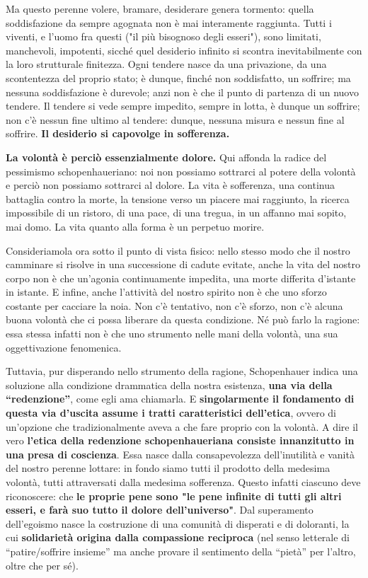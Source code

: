 Ma questo perenne volere, bramare, desiderare genera tormento: quella soddisfazione da sempre agognata non è mai interamente raggiunta. Tutti i viventi, e l’uomo fra questi ("il più bisognoso degli esseri"), sono limitati, manchevoli, impotenti, sicché quel desiderio infinito si scontra inevitabilmente con la loro strutturale finitezza. Ogni tendere nasce da una privazione, da una scontentezza del proprio stato; è dunque, finché non soddisfatto, un soffrire; ma nessuna soddisfazione è durevole; anzi non è che il punto di partenza di un nuovo tendere. Il tendere si vede sempre impedito, sempre in lotta, è dunque un soffrire; non c’è nessun fine ultimo al tendere: dunque, nessuna misura e nessun fine al soffrire. \textbf{Il desiderio si capovolge in sofferenza. }

\textbf{La volontà è perciò essenzialmente dolore.} Qui affonda la radice del pessimismo schopenhaueriano: noi non possiamo sottrarci al potere della volontà e perciò non possiamo sottrarci al dolore. La vita è sofferenza, una continua battaglia contro la morte, la tensione verso un piacere mai raggiunto, la ricerca impossibile di un ristoro, di una pace, di una tregua, in un affanno mai sopito, mai domo. La vita quanto alla forma è un perpetuo morire. 

Consideriamola ora sotto il punto di vista fisico: nello stesso modo che il nostro camminare si risolve in una successione di cadute evitate, anche la vita del nostro corpo non è che un’agonia continuamente impedita, una morte differita d’istante in istante. E infine, anche l’attività del nostro spirito non è che uno sforzo costante per cacciare la noia.  Non c’è tentativo, non c’è sforzo, non c’è alcuna buona volontà che ci possa liberare da questa condizione. Né può farlo la ragione: essa stessa infatti non è che uno strumento nelle mani della volontà, una sua oggettivazione fenomenica.

Tuttavia, pur disperando nello strumento della ragione, Schopenhauer indica una soluzione alla condizione drammatica della nostra esistenza, \textbf{una via della “redenzione”}, come egli ama chiamarla. E \textbf{singolarmente il fondamento di questa via d’uscita assume i tratti caratteristici dell’etica}, ovvero di un’opzione che tradizionalmente aveva a che fare proprio con la volontà. A dire il vero \textbf{l’etica della redenzione schopenhaueriana consiste innanzitutto in una presa di coscienza}. Essa nasce dalla consapevolezza dell’inutilità e vanità del nostro perenne lottare: in fondo siamo tutti il prodotto della medesima volontà, tutti attraversati dalla medesima sofferenza. Questo infatti ciascuno deve riconoscere: che \textbf{le proprie pene sono "le pene infinite di tutti gli altri esseri, e farà suo tutto il dolore dell’universo"}. Dal superamento dell’egoismo nasce la costruzione di una comunità di disperati e di doloranti, la cui \textbf{solidarietà origina dalla compassione reciproca} (nel senso letterale di “patire/soffrire insieme” ma anche provare il sentimento della “pietà” per l’altro, oltre che per sé). 

